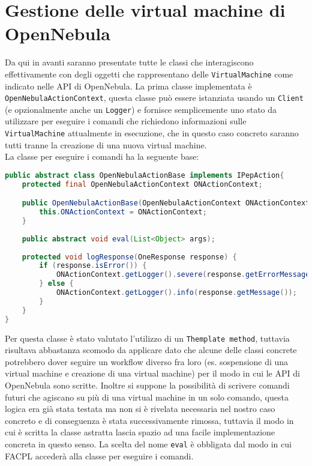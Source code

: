 \section{Gestione delle virtual machine di OpenNebula}
Da qui in avanti saranno presentate tutte le classi che interagiscono effettivamente con degli oggetti che rappresentano delle \texttt{VirtualMachine} come indicato nelle API di OpenNebula.
La prima classe implementata è \texttt{OpenNebulaActionContext}, questa classe può essere istanziata usando un \texttt{Client} (e opzionalmente anche un \texttt{Logger}) e fornisce semplicemente uno stato da utilizzare per eseguire i comandi che richiedono informazioni sulle \texttt{VirtualMachine} attualmente in esecuzione, che in questo caso concreto saranno tutti tranne la creazione di una nuova virtual machine.\\
La classe per eseguire i comandi ha la seguente base:
\begin{lstlisting}[language=Java, caption=Classe astratta per i comandi, label=code:OpenNebulaActionBase]
public abstract class OpenNebulaActionBase implements IPepAction{
    protected final OpenNebulaActionContext ONActionContext;

    public OpenNebulaActionBase(OpenNebulaActionContext ONActionContext) {
        this.ONActionContext = ONActionContext;
    }
    
    public abstract void eval(List<Object> args);
    
    protected void logResponse(OneResponse response) {
        if (response.isError()) {
            ONActionContext.getLogger().severe(response.getErrorMessage());
        } else {
            ONActionContext.getLogger().info(response.getMessage());
        }
    }
}
\end{lstlisting}
Per questa classe è stato valutato l'utilizzo di un \texttt{Themplate method}, tuttavia risultava abbastanza scomodo da applicare dato che alcune delle classi concrete potrebbero dover seguire un workflow diverso fra loro (es. sospensione di una virtual machine e creazione di una virtual machine) per il modo in cui le API di OpenNebula sono scritte. Inoltre si suppone la possibilità di scrivere comandi futuri che agiscano su più di una virtual machine in un solo comando, questa logica era già stata testata ma non si è rivelata necessaria nel nostro caso concreto e di conseguenza è stata successivamente rimossa, tuttavia il modo in cui è scritta la classe astratta lascia spazio ad una facile implementazione concreta in questo senso.\medbreak
La scelta del nome \texttt{eval} è obbligata dal modo in cui FACPL accederà alla classe per eseguire i comandi.
